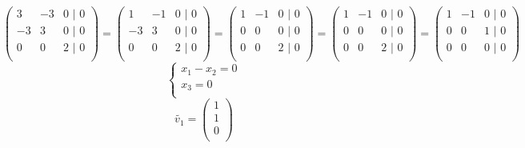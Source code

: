 \documentclass{article}
\begin{document}
    \begin{equation*}
        \begin{pmatrix}
            3& -3& 0 \text{ |  0}\\
            -3& 3& 0 \text{ |  0}\\
            0& 0& 2  \text{ |  0}\\
        \end{pmatrix}
         =
         \begin{pmatrix}
            1& -1& 0 \text{ |  0}\\
            -3& 3& 0 \text{ |  0}\\
            0& 0& 2 \text{ |  0}\\
        \end{pmatrix}
        =
        \begin{pmatrix}
            1& -1& 0 \text{ |  0}\\
            0& 0& 0 \text{ |  0}\\
            0& 0& 2 \text{ |  0}\\
        \end{pmatrix}
        =
        \begin{pmatrix}
            1& -1& 0 \text{ |  0}\\
            0& 0& 0 \text{ |  0}\\
            0& 0& 2 \text{ |  0}\\
        \end{pmatrix}
        =
        \begin{pmatrix}
            1& -1& 0 \text{ |  0}\\
            0& 0& 1 \text{ |  0}\\
            0& 0& 0 \text{ |  0}\\
        \end{pmatrix}
    \end{equation*}
    \begin{equation*}
        \begin{cases}
            x_1 - x_2 = 0 \\
            x_3= 0 \\
        \end{cases}
    \end{equation*}
    \begin{equation*}
   \widetilde{v_1} = 
        \begin{pmatrix}
            1\\
            1 \\
            0  \\
        \end{pmatrix}
    \end{equation*}
\end{document}
